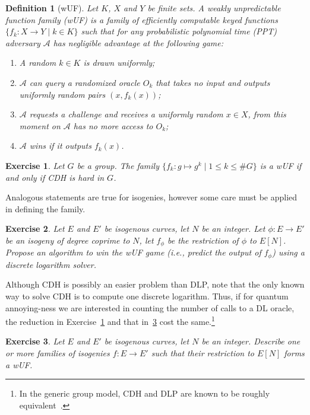 \documentclass{article}
\newtheorem{ex}{Exercise}
\newtheorem{defi}{Definition}
\begin{document}
\begin{defi}[wUF]
  Let $K$, $X$ and $Y$ be finite sets.  A \emph{weakly unpredictable
    function family} (wUF) is a family of efficiently computable
  \emph{keyed} functions $\{f_k: X \to Y \;|\; k\in K\}$ such that for
  any probabilistic polynomial time (PPT) adversary $\mathcal{A}$ has
  negligible advantage at the following game:
  \begin{enumerate}
  \item A random $k\in K$ is drawn uniformly;
  \item $\mathcal{A}$ can query a randomized oracle $O_k$ that takes
    no input and outputs uniformly random pairs $(x,f_k(x))$;
  \item $\mathcal{A}$ requests a challenge and receives a uniformly
    random $x\in X$, from this moment on $\mathcal{A}$ has no more
    access to $O_k$;
  \item $\mathcal{A}$ wins if it outputs $f_k(x)$.
  \end{enumerate}
\end{defi}

\begin{ex}
  \label{ex:prf}
  Let $G$ be a group. The family
  $\{f_k : g\mapsto g^k \;|\; 1\le k\le \#G \}$ is a wUF if and only
  if CDH is hard in $G$.
\end{ex}

Analogous statements are true for isogenies, however some care must be
applied in defining the family.

\begin{ex}
  \label{ex:prf-isog-break}
  Let $E$ and $E'$ be isogenous curves, let $N$ be an integer.  Let
  $\phi:E\to E'$ be an isogeny of degree coprime to $N$, let $f_\phi$
  be the restriction of $\phi$ to $E[N]$.  Propose an algorithm to win
  the wUF game (i.e., predict the output of $f_\phi$) using a discrete
  logarithm solver.
\end{ex}

Although CDH is possibly an easier problem than DLP, note that the
only known way to solve CDH is to compute one discrete logarithm.
Thus, if for quantum annoying-ness we are interested in counting the
number of calls to a DL oracle, the reduction in Exercise~\ref{ex:prf}
and that in~\ref{ex:prf-isog} cost the same.\footnote{In the generic
  group model, CDH and DLP are known to be roughly
  equivalent~\cite{EC:Shoup97,EC:MauWol98}.}

\begin{ex}
  \label{ex:prf-isog}
  Let $E$ and $E'$ be isogenous curves, let $N$ be an integer.
  Describe one or more families of isogenies $f:E\to E'$ such that
  their restriction to $E[N]$ forms a wUF.
\end{ex}
\end{document}
